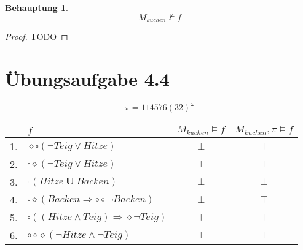 \documentclass[a4paper]{scrartcl}
\newtheorem*{behaupt}{Behauptung}
\begin{document}
\begin{enumerate}
        \begin{behaupt}
            \begin{equation}
                M_{kuchen} \not\models f
            \end{equation}
        \end{behaupt}

        \begin{proof}
            TODO
        \end{proof}

\end{enumerate}

\section*{Übungsaufgabe 4.4}
\begin{equation*}
    \pi = 114576(32)^\omega
\end{equation*}

\begin{table}[h]
    \centering
    \begin{tabular}{r|l|c|c}
           & $f$ & $M_{kuchen} \models  f$ & $M_{kuchen}, \pi \models  f$ \\ \hline
        1. & $\diamond\square(\lnot Teig \lor Hitze)$                     & $\bot$ & $\top$ \\
        2. & $\square\diamond(\lnot Teig \lor Hitze)$                     & $\top$ & $\top$ \\
        3. & $\square(Hitze ~\textbf{U}~ Backen)$                         & $\bot$ & $\bot$ \\
        4. & $\square\diamond(Backen \Rightarrow \circ\circ\lnot Backen)$ & $\bot$ & $\top$ \\
        5. & $\square((Hitze \land Teig) \Rightarrow \diamond\lnot Teig)$ & $\top$ & $\top$ \\
        6. & $\circ\circ\diamond(\lnot Hitze \land \lnot Teig)$           & $\bot$ & $\bot$ \\
    \end{tabular}
\end{table}
\end{document}
